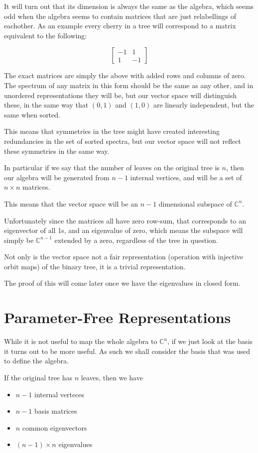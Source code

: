 \documentclass[10pt,a4paper]{report}
\newcommand{\C}{\mathbb{C}}
\begin{document}
It will turn out that its dimension is always the same as the algebra, which
seems odd when the algebra seems to contain matrices that are just relabellings
of eachother.
As an example every cherry in a tree will correspond to a matrix equivalent to
the following:

\[
	\left[ \begin{matrix}
		-1 & 1\\
		1 & -1
	\end{matrix} \right]
\]

The exact matrices are simply the above with added rows and columns of zero.
The spectrum of any matrix in this form should be the same as any other, and in
unordered representations they will be, but our vector space will
distinguish these, in the same way that $(0, 1)$ and $(1, 0)$ are linearly
independent, but the same when sorted.

This means that symmetries in the tree might have created interesting
redundancies in the set of sorted spectra, but our vector space will not
reflect these symmetries in the same way.

In particular if we say that the number of leaves on the original tree is $n$,
then our algebra will be generated from $n-1$ internal vertices, and will be a set
of $n \times n$ matrices.

This means that the vector space will be an $n-1$ dimensional subspace of
$\C^n$.

Unfortunately since the matrices all have zero row-sum, that corresponds to an
eigenvector of all 1s, and an eigenvalue of zero, which means the subspace will
simply be $\C^{n-1}$ extended by a zero, regardless of the tree in
question.

Not only is the vector space not a fair representation (operation with injective orbit maps) of the binary tree, it
is a trivial representation.

The proof of this will come later once we have the eigenvalues in closed form.

\section{Parameter-Free Representations}

While it is not useful to map the whole algebra to $\C^n$, if we just
look at the basis it turns out to be more useful.
As such we shall consider the basis that was used to define the algebra.

If the original tree has $n$ leaves, then we have
\begin{itemize}
	\item $n-1$ internal verteces
	\item $n-1$ basis matrices
	\item $n$ common eigenvectors
	\item $(n-1) \times n$ eigenvalues
\end{itemize}
\end{document}
